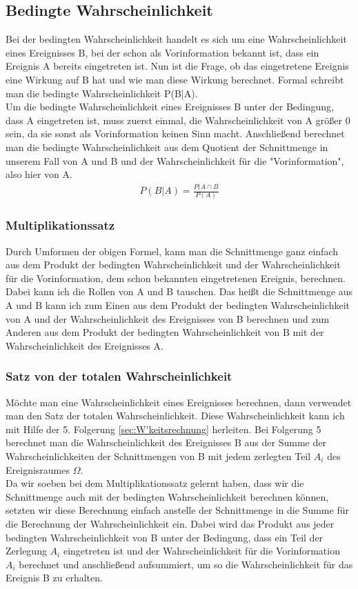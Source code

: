 \documentclass[a4paper]{article}
\begin{document}
\subsection{Bedingte Wahrscheinlichkeit}
Bei der bedingten Wahrscheinlichkeit handelt es sich um eine Wahrscheinlichkeit eines Ereignisses B, bei der schon als Vorinformation bekannt ist, dass ein Ereignis A bereits eingetreten ist. Nun ist die Frage, ob das eingetretene Ereignis eine Wirkung auf B hat und wie man diese Wirkung berechnet. Formal schreibt man die bedingte Wahrscheinlichkeit P(B|A).\\
Um die bedingte Wahrscheinlichkeit eines Ereignisses B unter der Bedingung, dass A eingetreten ist, muss zuerst einmal, die Wahrscheinlichkeit von A größer 0 sein, da sie sonst als Vorinformation keinen Sinn macht. Anschließend berechnet man die bedingte Wahrscheinlichkeit aus dem Quotient der Schnittmenge in unserem Fall von A und B und der Wahrscheinlichkeit für die  "Vorinformation", also hier von A.
\begin{align*}
    P(B|A)=\frac{P(A\cap B}{P(A)}
\end{align*}


\subsubsection{Multiplikationssatz}
Durch Umformen der obigen Formel, kann man die Schnittmenge ganz einfach aus dem Produkt der bedingten Wahrscheinlichkeit und der Wahrscheinlichkeit für die Vorinformation, dem schon bekannten eingetretenen Ereignis, berechnen. Dabei kann ich die Rollen von A und B tauschen. Das heißt die Schnittmenge aus A und B kann ich zum Einen aus dem Produkt der bedingten Wahrscheinlichkeit von A und der Wahrscheinlichkeit des Ereignisses von B berechnen und zum Anderen aus dem Produkt der bedingten Wahrscheinlichkeit von B mit der Wahrscheinlichkeit des Ereignisses A.

\subsubsection{Satz von der totalen Wahrscheinlichkeit}
Möchte man eine Wahrscheinlichkeit eines Ereignisses berechnen, dann verwendet man den Satz der totalen Wahrscheinlichkeit. Diese Wahrscheinlichkeit kann ich mit Hilfe der 5. Folgerung \ref{sec:W'keitsrechnung} herleiten. Bei Folgerung 5 berechnet man die Wahrscheinlichkeit des Ereignisses B aus der Summe der Wahrscheinlichkeiten der Schnittmengen von B mit jedem zerlegten Teil $A_i$ des Ereignisraumes $\Omega$. \\
Da wir soeben bei dem Multiplikationssatz gelernt haben, dass wir die Schnittmenge auch mit der bedingten Wahrscheinlichkeit berechnen können, setzten wir diese Berechnung einfach anstelle der Schnittmenge in die Summe für die Berechnung der Wahrscheinlichkeit ein. Dabei wird das Produkt aus jeder bedingten Wahrscheinlichkeit von B unter der Bedingung, dass ein Teil der Zerlegung $A_i$ eingetreten ist und der Wahrscheinlichkeit für die Vorinformation $A_i$ berechnet und anschließend aufsummiert, um so die Wahrscheinlichkeit für das Ereignis B zu erhalten.
\end{document}
